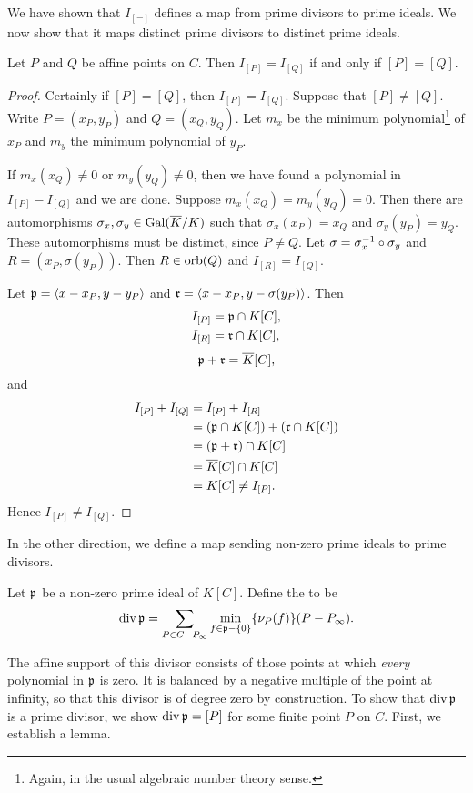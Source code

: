We have shown that $I_{[-]}$ defines a map from prime divisors to prime ideals.
We now show that it maps distinct prime divisors to distinct prime ideals.
\begin{lemma}
  \label{lemma_orbs_and_ideals}
  Let $P$ and $Q$ be affine points on $C$.
  Then $I_{[P]} = I_{[Q]}$ if and only if $[P] = [Q]$.
\end{lemma}
\begin{proof}
  Certainly if $[P] = [Q]$, then $I_{[P]} = I_{[Q]}$.
  Suppose that $[P] \neq [Q]$.
  Write $P = (x_P, y_P)$ and $Q = (x_Q, y_Q)$.
  Let $m_x$ be the minimum polynomial\footnote{
  Again, in the usual algebraic number theory sense.}
  of $x_P$ and $m_y$ the minimum polynomial of $y_P$.
  
  If $m_x(x_Q) \neq 0$ or $m_y(y_Q) \neq 0$, then we have found a polynomial in $I_{[P]} - I_{[Q]}$ and we are done.
  Suppose $m_x(x_Q) = m_y(y_Q) = 0$.
  Then there are automorphisms $\sigma_x, \sigma_y \in \Gal(\bar K/K)$ such that
  $\sigma_x(x_P) = x_Q$ and $\sigma_y(y_P) = y_Q$.
  These automorphisms must be distinct, since $P \neq Q$.
  Let $\sigma = \sigma_x\inv \circ \sigma_y$ and $R = (x_P, \sigma(y_P))$.
  Then $R \in \orb(Q)$ and $I_{[R]} = I_{[Q]}$.

  Let $\frak p = \pid{x - x_P, y - y_P}$ and $\frak r = \pid{x - x_P, y - \sigma(y_P)}$. Then
  \begin{align*}
    I_{[P]} &= \frak p \cap K[C], \\
    I_{[R]} &= \frak r \cap K[C],
  \end{align*}
  \[ \frak p + \frak r = \bar K[C], \]
  and
  \begin{align*}
    I_{[P]} + I_{[Q]}
      &= I_{[P]} + I_{[R]} \\
      &= (\frak p \cap K[C]) + (\frak r \cap K[C]) \\
      &= (\frak p  + \frak r) \cap K[C] \\
      &= \bar K[C] \cap K[C] \\
      &= K[C] \neq I_{[P]}.
  \end{align*}
  Hence $I_{[P]} \neq I_{[Q]}$.
\end{proof}

In the other direction, we define a map sending non-zero prime ideals to prime divisors.
\begin{definition}
  \label{def_div_p}
  Let $\frak p$ be a non-zero prime ideal of $K[C]$.
  Define the  to be
  \[ \div \frak p = \sum_{P \in C - P_\infty} \min_{f \in \frak p - \{0\}}\{\nu_P(f)\}(P - P_\infty). \]
\end{definition}
The affine support of this divisor consists of those points at which \emph{every} polynomial in $\frak p$ is zero.
It is balanced by a negative multiple of the point at infinity,
so that this divisor is of degree zero by construction.
To show that $\div \frak p$ is a prime divisor,
we show $\div \frak p = [P]$ for some finite point $P$ on $C$.
First, we establish a lemma.

